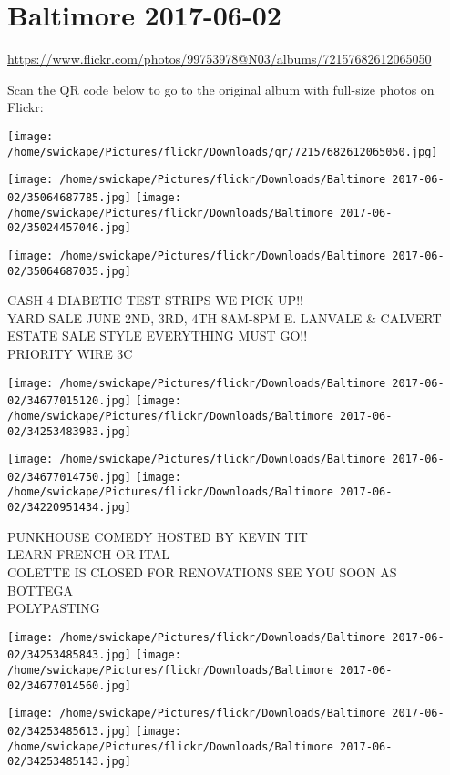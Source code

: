 \documentclass[10pt,letterpaper]{article}
\title{}
\author{}
\date{}
\begin{document}
\section*{Baltimore 2017-06-02}

\url{https://www.flickr.com/photos/99753978@N03/albums/72157682612065050}

Scan the QR code below to go to the original album with full-size photos on Flickr:

\texttt{[image: /home/swickape/Pictures/flickr/Downloads/qr/72157682612065050.jpg]}
\pagebreak

\texttt{[image: /home/swickape/Pictures/flickr/Downloads/Baltimore 2017-06-02/35064687785.jpg]}
\texttt{[image: /home/swickape/Pictures/flickr/Downloads/Baltimore 2017-06-02/35024457046.jpg]}

\vspace{0.25in}
\texttt{[image: /home/swickape/Pictures/flickr/Downloads/Baltimore 2017-06-02/35064687035.jpg]}

CASH 4 DIABETIC TEST STRIPS WE PICK UP!!\\
YARD SALE JUNE 2ND, 3RD, 4TH 8AM{-}8PM E. LANVALE \& CALVERT ESTATE SALE STYLE EVERYTHING MUST GO!!\\
PRIORITY WIRE 3C
\pagebreak

\texttt{[image: /home/swickape/Pictures/flickr/Downloads/Baltimore 2017-06-02/34677015120.jpg]}
\texttt{[image: /home/swickape/Pictures/flickr/Downloads/Baltimore 2017-06-02/34253483983.jpg]}

\texttt{[image: /home/swickape/Pictures/flickr/Downloads/Baltimore 2017-06-02/34677014750.jpg]}
\texttt{[image: /home/swickape/Pictures/flickr/Downloads/Baltimore 2017-06-02/34220951434.jpg]}

PUNKHOUSE COMEDY HOSTED BY KEVIN TIT\\
LEARN FRENCH OR ITAL\\
COLETTE IS CLOSED FOR RENOVATIONS SEE YOU SOON AS BOTTEGA\\
POLYPASTING
\pagebreak

\texttt{[image: /home/swickape/Pictures/flickr/Downloads/Baltimore 2017-06-02/34253485843.jpg]}
\texttt{[image: /home/swickape/Pictures/flickr/Downloads/Baltimore 2017-06-02/34677014560.jpg]}

\texttt{[image: /home/swickape/Pictures/flickr/Downloads/Baltimore 2017-06-02/34253485613.jpg]}
\texttt{[image: /home/swickape/Pictures/flickr/Downloads/Baltimore 2017-06-02/34253485143.jpg]}
\end{document}
